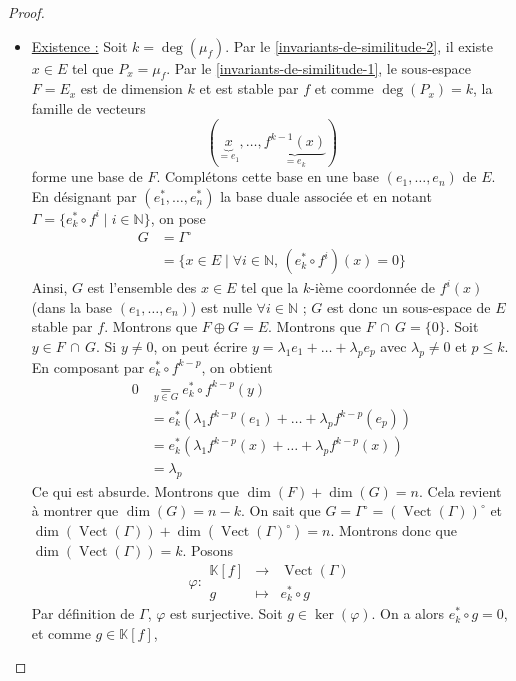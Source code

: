 	\begin{proof}
		\begin{itemize}
			\item \uline{Existence :} Soit $k = \deg(\mu_f)$. Par le \cref{invariants-de-similitude-2}, il existe $x \in E$ tel que $P_x = \mu_f$. Par le \cref{invariants-de-similitude-1}, le sous-espace $F = E_x$ est de dimension $k$ et est stable par $f$ et comme $\deg(P_x) = k$, la famille de vecteurs
			\[ (\underbrace{x}_{= e_1}, \dots, \underbrace{f^{k-1}(x)}_{= e_k}) \]
			forme une base de $F$. Complétons cette base en une base $(e_1, \dots, e_n)$ de $E$. En désignant par $(e_1^*, \dots, e_n^*)$ la base duale associée et en notant $\Gamma = \{ e_k^* \circ f^i \mid i \in \mathbb{N} \}$, on pose
			\begin{align*}
				G &= \Gamma^\circ \\
				&= \{ x \in E \mid \forall i \in \mathbb{N}, \, (e_k^* \circ f^i)(x) = 0 \}
			\end{align*}
			Ainsi, $G$ est l'ensemble des $x \in E$ tel que la $k$-ième coordonnée de $f^i(x)$ (dans la base $(e_1, \dots, e_n)$)  est nulle $\forall i \in \mathbb{N}$ ; $G$ est donc un sous-espace de $E$ stable par $f$. Montrons que $F \oplus G = E$.
			\newpar
			Montrons que $F \, \cap \, G = \{ 0 \}$. Soit $y \in F \, \cap \, G$. Si $y \neq 0$, on peut écrire $y = \lambda_1 e_1 + \dots + \lambda_p e_p$ avec $\lambda_p \neq 0$ et $p \leq k$. En composant par $e_k^* \circ f^{k-p}$, on obtient
			\begin{align*}
				0 &\underset{y \in G}{=} e_k^* \circ f^{k-p}(y) \\
				&= e_k^* (\lambda_1 f^{k-p}(e_1) + \dots + \lambda_p f^{k-p}(e_p)) \\
				&= e_k^* (\lambda_1 f^{k-p}(x) + \dots + \lambda_p f^{k-p}(x)) \\
				&= \lambda_p
			\end{align*}
			Ce qui est absurde.
			\newpar
			Montrons que $\dim(F) + \dim(G) = n$. Cela revient à montrer que $\dim(G) = n - k$. On sait que $G = \Gamma^\circ = (\operatorname{Vect}(\Gamma))^\circ$ et $\dim(\operatorname{Vect}(\Gamma)) + \dim(\operatorname{Vect}(\Gamma)^\circ) = n$. Montrons donc que $\dim(\operatorname{Vect}(\Gamma)) = k$. Posons
			\[
			\varphi :
			\begin{array}{ccc}
				\mathbb{K}[f] &\rightarrow& \operatorname{Vect}(\Gamma) \\
				g &\mapsto& e_k^* \circ g
			\end{array}
			\]
			Par définition de $\Gamma$, $\varphi$ est surjective. Soit $g \in \ker(\varphi)$. On a alors $e_k^* \circ g = 0$, et comme $g \in \mathbb{K}[f]$,

\end{itemize}
\end{proof}
